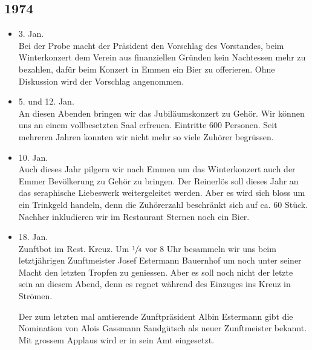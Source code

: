 \subsection*{1974}

\begin{history}


    \begin{itemize}
        \item 3. Jan.\\
              Bei der Probe macht der Präsident den Vorschlag des Vorstandes, beim
              Winterkonzert dem Verein aus finanziellen Gründen kein Nachtessen mehr
              zu bezahlen, dafür beim Konzert in Emmen ein Bier zu offerieren. Ohne
              Diskussion wird der Vorschlag angenommen.

        \item 5. und 12. Jan.\\
              An diesen Abenden bringen wir das Jubiläumskonzert zu Gehör. Wir können
              uns an einem vollbesetzten Saal erfreuen. Eintritte 600 Personen. Seit
              mehreren Jahren konnten wir nicht mehr so viele Zuhörer begrüssen.

        \item 10. Jan.\\
              Auch dieses Jahr pilgern wir nach Emmen um das Winterkonzert auch der
              Emmer Bevölkerung zu Gehör zu bringen. Der Reinerlös soll dieses Jahr an
              das seraphische Liebeswerk weitergeleitet werden. Aber es wird sich
              bloss um ein Trinkgeld handeln, denn die Zuhörerzahl beschränkt sich auf
              ca. 60 Stück. Nachher inkludieren wir im Restaurant Sternen noch ein
              Bier.

        \item 18. Jan.\\
              Zunftbot im Rest. Kreuz. Um $\sfrac{1}{4}$ vor 8 Uhr besammeln wir uns
              beim letztjährigen Zunftmeister Josef Estermann Bauernhof um noch unter
              seiner Macht den letzten Tropfen zu geniessen. Aber es soll noch nicht
              der letzte sein an diesem Abend, denn es regnet während des Einzuges ins
              Kreuz in Strömen.

              Der zum letzten mal amtierende Zunftpräsident Albin Estermann gibt die
              Nomination von Alois Gassmann Sandgütsch als neuer Zunftmeister bekannt.
              Mit grossem Applaus wird er in sein Amt eingesetzt.


\end{itemize}
\end{history}
